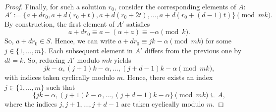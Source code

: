 \documentclass[10pt,a4paper]{amsart}
\begin{document}
\begin{proof}
Finally, for such a solution $r_0$, consider the corresponding elements of $A$: \begin{equation*}
    A' :=\{a+dr_0,a+d(r_0+t),a+d(r_0+2t),\ldots,a+d(r_0+(d-1)t)\} \pmod {mk}.
\end{equation*} By construction, the first element of $A'$ satisfies \begin{equation*}
    a+dr_0 \equiv a-(\alpha+a) \equiv -\alpha \pmod k.
\end{equation*} So, $a+dr_0 \in S$. Hence, we can write $a+dr_0 \equiv jk-\alpha \pmod {mk}$ for some $j \in \{1,\ldots,m\}$. Each subsequent element in $A'$ differs from the previous one by $dt = k$. So, reducing $A'$ modulo $mk$ yields \begin{equation*}
    jk-\alpha, (j+1)k-\alpha,\ldots,(j+d-1)k-\alpha \pmod {mk},
\end{equation*} with indices taken cyclically modulo $m$. Hence, there exists an index $j \in \{1,\ldots,m\}$ such that \begin{equation*}
    \{jk-\alpha,(j+1)k-\alpha,\ldots,(j+d-1)k-\alpha\} \pmod {mk} \subseteq A,
\end{equation*} where the indices $j,j+1,\ldots,j+d-1$ are taken cyclically modulo $m$.
\end{proof}
\end{document}
